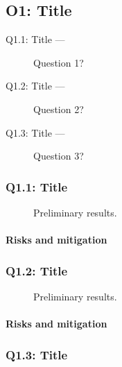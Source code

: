 \documentclass{nsf}
\begin{document}
\subsection{O1: Title}
\label{sec:o1}

\lipsum[1]

\begin{questions}
  \begin{description}
  \item[Q1.1: Title —] Question 1?
  \item[Q1.2: Title —] Question 2?
  \item[Q1.3: Title —] Question 3?
  \end{description}
\end{questions}

\subsubsection{Q1.1: Title}
\label{sec:q11}

\begin{wrapfigure}[14]{r}{.5\textwidth}
  \centering
  \caption{Preliminary results.}
  \label{fig:q11fig}
\end{wrapfigure}
\lipsum[1-3]
\paragraph{Risks and mitigation}
\lipsum[4]

\subsubsection{Q1.2: Title}
\label{sec:q12}

\begin{wrapfigure}[14]{r}{.5\textwidth}
  \centering
  \caption{Preliminary results.}
  \label{fig:q12fig}
\end{wrapfigure}
\lipsum[1-3]
\paragraph{Risks and mitigation}
\lipsum[4]

\subsubsection{Q1.3: Title}
\label{sec:q13}
\end{document}
